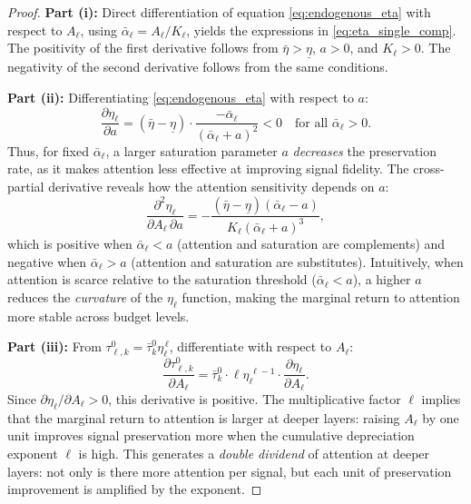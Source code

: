\begin{proof}
\noindent\textbf{Part (i):} Direct differentiation of equation \eqref{eq:endogenous_eta} with respect to $A_\ell$, using $\bar{\alpha}_\ell = A_\ell / K_\ell$, yields the expressions in \eqref{eq:eta_single_comp}. The positivity of the first derivative follows from $\bar{\eta} > \underline{\eta}$, $a > 0$, and $K_\ell > 0$. The negativity of the second derivative follows from the same conditions.

\noindent\textbf{Part (ii):} Differentiating \eqref{eq:endogenous_eta} with respect to $a$:
\begin{equation*}
\frac{\partial \eta_\ell}{\partial a} = (\bar{\eta} - \underline{\eta}) \cdot \frac{-\bar{\alpha}_\ell}{(\bar{\alpha}_\ell + a)^2} < 0 \quad \text{for all } \bar{\alpha}_\ell > 0.
\end{equation*}
Thus, for fixed $\bar{\alpha}_\ell$, a larger saturation parameter $a$ \emph{decreases} the preservation rate, as it makes attention less effective at improving signal fidelity. The cross-partial derivative reveals how the attention sensitivity depends on $a$:
\begin{equation*}
\frac{\partial^2 \eta_\ell}{\partial A_\ell \, \partial a} = -\frac{(\bar{\eta} - \underline{\eta})(\bar{\alpha}_\ell - a)}{K_\ell(\bar{\alpha}_\ell + a)^3},
\end{equation*}
which is positive when $\bar{\alpha}_\ell < a$ (attention and saturation are complements) and negative when $\bar{\alpha}_\ell > a$ (attention and saturation are substitutes). Intuitively, when attention is scarce relative to the saturation threshold ($\bar{\alpha}_\ell < a$), a higher $a$ reduces the \emph{curvature} of the $\eta_\ell$ function, making the marginal return to attention more stable across budget levels.

\noindent\textbf{Part (iii):} From $\tau^0_{\ell,k} = \bar{\tau}^0_k \eta_\ell^{\,\ell}$, differentiate with respect to $A_\ell$:
\begin{equation*}
\frac{\partial \tau^0_{\ell,k}}{\partial A_\ell} = \bar{\tau}^0_k \cdot \ell \eta_\ell^{\,\ell-1} \cdot \frac{\partial \eta_\ell}{\partial A_\ell}.
\end{equation*}
Since $\partial \eta_\ell / \partial A_\ell > 0$, this derivative is positive. The multiplicative factor $\ell$ implies that the marginal return to attention is larger at deeper layers: raising $A_\ell$ by one unit improves signal preservation more when the cumulative depreciation exponent $\ell$ is high. This generates a \emph{double dividend} of attention at deeper layers: not only is there more attention per signal, but each unit of preservation improvement is amplified by the exponent.
\end{proof}

